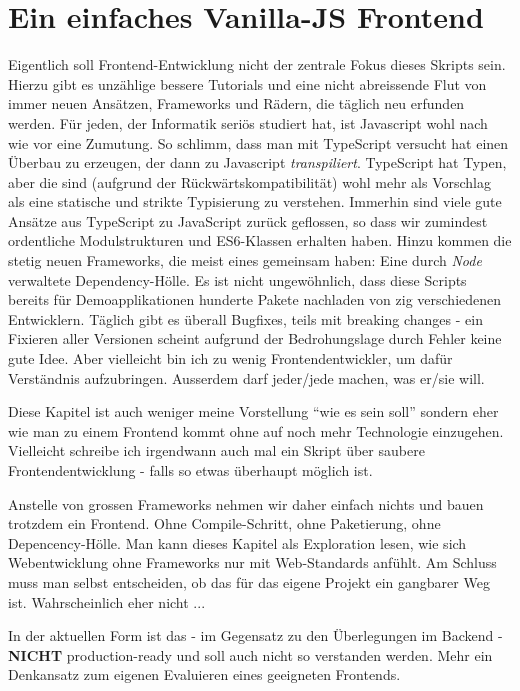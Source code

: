 \section{Ein einfaches Vanilla-JS Frontend}
Eigentlich soll Frontend-Entwicklung nicht der zentrale Fokus dieses Skripts
sein. Hierzu gibt es unzählige bessere Tutorials und eine nicht abreissende
Flut von immer neuen Ansätzen, Frameworks und Rädern, die täglich neu erfunden
werden. Für jeden, der Informatik seriös studiert hat, ist Javascript wohl nach
wie vor eine Zumutung. So schlimm, dass man mit TypeScript versucht hat
einen Überbau zu erzeugen, der dann zu Javascript \textit{transpiliert}.
TypeScript hat Typen, aber die sind (aufgrund der Rückwärtskompatibilität)
wohl mehr als Vorschlag als eine statische und strikte Typisierung zu 
verstehen. Immerhin sind viele gute Ansätze aus TypeScript zu JavaScript
zurück geflossen, so dass wir zumindest ordentliche Modulstrukturen und 
ES6-Klassen erhalten haben.
Hinzu kommen die stetig neuen Frameworks, die meist eines gemeinsam haben:
Eine durch \textit{Node} verwaltete Dependency-Hölle. Es ist nicht ungewöhnlich,
dass diese Scripts bereits für Demoapplikationen hunderte Pakete nachladen
von zig verschiedenen Entwicklern. Täglich gibt es überall Bugfixes, teils
mit breaking changes - ein Fixieren aller Versionen scheint aufgrund der 
Bedrohungslage durch Fehler keine gute Idee. Aber vielleicht bin ich zu wenig
Frontendentwickler, um dafür Verständnis aufzubringen. Ausserdem darf 
jeder/jede machen, was er/sie will.

Diese Kapitel ist auch weniger meine Vorstellung ``wie es sein soll''
sondern eher wie man zu einem Frontend kommt ohne auf noch mehr 
Technologie einzugehen. Vielleicht schreibe ich irgendwann auch mal
ein Skript über saubere Frontendentwicklung - falls so etwas überhaupt
möglich ist.

Anstelle von grossen Frameworks nehmen
wir daher einfach nichts und bauen trotzdem ein Frontend. Ohne 
Compile-Schritt, ohne Paketierung, ohne Depencency-Hölle. Man kann dieses
Kapitel als Exploration lesen, wie sich Webentwicklung ohne Frameworks nur 
mit Web-Standards anfühlt. Am Schluss muss man selbst entscheiden, ob das 
für das eigene Projekt ein gangbarer Weg ist. Wahrscheinlich eher nicht ...

In der aktuellen Form ist das - im Gegensatz zu den Überlegungen im Backend -
\textbf{NICHT} production-ready und soll auch nicht so verstanden werden.
Mehr ein Denkansatz zum eigenen Evaluieren eines geeigneten Frontends.

